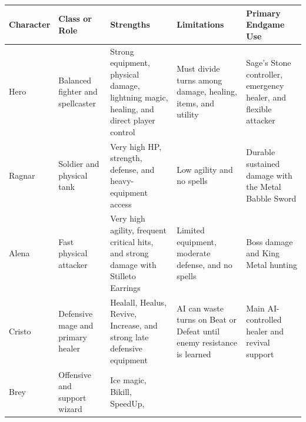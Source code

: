 \documentclass[
  american,
  10pt,
  letterpaper,
  oneside,
  open=any]{scrreprt}
\newcounter{none} %
\newenvironment{guidetable}{%
  \small\setstretch{1.0}%
  \setlength{\tabcolsep}{4pt}%
  \setlength{\LTpre}{8pt}\setlength{\LTpost}{10pt}%
  \renewcommand{\arraystretch}{1.16}%
}{ }
\begin{document}
\begin{landscape}
\begin{guidetable}
{\def\LTcaptype{none} %
\begin{longtable}[]{@{}
  >{\raggedright\arraybackslash}p{}
  >{\raggedright\arraybackslash}p{}
  >{\raggedright\arraybackslash}p{}
  >{\raggedright\arraybackslash}p{}
  >{\raggedright\arraybackslash}p{}@{}}
\toprule\noalign{}
\begin{minipage}[b]{\linewidth}\raggedright
\color{GuideGreen}\bfseries Character
\end{minipage} & \begin{minipage}[b]{\linewidth}\raggedright
\color{GuideGreen}\bfseries Class or Role
\end{minipage} & \begin{minipage}[b]{\linewidth}\raggedright
\color{GuideGreen}\bfseries Strengths
\end{minipage} & \begin{minipage}[b]{\linewidth}\raggedright
\color{GuideGreen}\bfseries Limitations
\end{minipage} & \begin{minipage}[b]{\linewidth}\raggedright
\color{GuideGreen}\bfseries Primary Endgame Use
\end{minipage} \\
\midrule\noalign{}
\endhead
\bottomrule\noalign{}
\endlastfoot
Hero & Balanced fighter and spellcaster & Strong equipment, physical
damage, lightning magic, healing, and direct player control & Must
divide turns among damage, healing, items, and utility & Sage's Stone
controller, emergency healer, and flexible attacker \\
Ragnar & Soldier and physical tank & Very high HP, strength, defense,
and heavy-equipment access & Low agility and no spells & Durable
sustained damage with the Metal Babble Sword \\
Alena & Fast physical attacker & Very high agility, frequent critical
hits, and strong damage with Stilleto Earrings & Limited equipment,
moderate defense, and no spells & Boss damage and King Metal hunting \\
Cristo & Defensive mage and primary healer & Healall, Healus, Revive,
Increase, and strong late defensive equipment & AI can waste turns on
Beat or Defeat until enemy resistance is learned & Main AI-controlled
healer and revival support \\
Brey & Offensive and support wizard & Ice magic, Bikill, SpeedUp,

\end{longtable}}
\end{guidetable}
\end{landscape}
\end{document}
